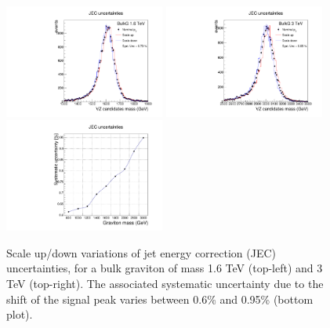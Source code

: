 \begin{figure}[hb!]
\begin{center}
\includegraphics[width=0.47\textwidth]{figures/systematics/jecUnc1600.pdf}
\includegraphics[width=0.47\textwidth]{figures/systematics/jecUnc3000.pdf}
\includegraphics[width=0.47\textwidth]{figures/systematics/jecUncMean.pdf}
\caption[Uncertainties due to jet energy correction]{Scale up/down variations of jet energy correction (JEC) uncertainties, for a bulk graviton of mass 1.6 TeV (top-left) and 3 TeV (top-right). The associated systematic uncertainty due to the shift of the signal peak varies between 0.6\% and 0.95\% (bottom plot). }
\label{fig:jecUnc}
\end{center}
\end{figure}

